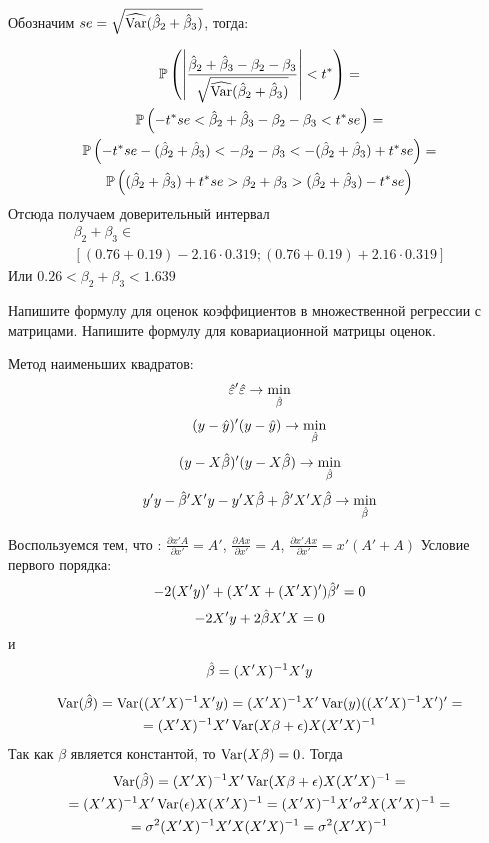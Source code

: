 \begin{solution}
\begin{enumerate}
Обозначим $se=\sqrt{\widehat{\operatorname{Var}}(\hat{\beta}_2 + \hat{\beta}_3)}$, тогда:

\begin{multline}
\mathbb{P} \left( \left| \frac{\hat{\beta}_2 + \hat{\beta}_3 - \beta_2 - \beta_3}{\sqrt{\widehat{\operatorname{Var}}(\hat{\beta}_2 + \hat{\beta}_3)}} \right| < t^* \right) = \\
\mathbb{P} \left( -t^* se < \hat{\beta}_2 + \hat{\beta}_3 - \beta_2 - \beta_3 < t^* se \right) = \\ 
\mathbb{P} \left( -t^*se  - (\hat{\beta}_2 + \hat{\beta}_3) < - \beta_2 - \beta_3  < -(\hat{\beta}_2 + \hat{\beta}_3) + t^* se \right) =\\ 
\mathbb{P} \left( (\hat{\beta}_2 + \hat{\beta}_3) + t^* se 
> \beta_2 + \beta_3 
> (\hat{\beta}_2 + \hat{\beta}_3) - t^* se \right) 
\end{multline}
Отсюда получаем доверительный интервал
\begin{multline}
\beta_2 + \beta_3 \in \\
[(0.76 + 0.19) - 2.16 \cdot 0.319;  (0.76 + 0.19) + 2.16 \cdot 0.319 ]
\end{multline}
Или $0.26< \beta_2 + \beta_3  < 1.639  $
\end{enumerate}
\end{solution}


\begin{problem}
Напишите формулу для оценок коэффициентов в множественной регрессии с матрицами. Напишите формулу для ковариационной матрицы оценок.
\end{problem}

\begin{solution}

Метод наименьших квадратов:
\[\hat{\varepsilon}'\hat{\varepsilon}\rightarrow \min_{\hat{\beta}}\]
\[(y-\hat{y})'(y-\hat{y})\rightarrow\min_{\hat{\beta}}\]
\[(y-X\hat{\beta})'(y-X\hat{\beta})\rightarrow\min_{\hat{\beta}}\]
\[y'y-\hat{\beta}' X'y-y'X\hat{\beta}+\hat{\beta}'X'X\hat{\beta}\rightarrow\min_{\hat{\beta}}\]

Воспользуемся тем, что : $\frac{\partial x'A}{\partial x'}=A'$, $\frac{\partial Ax}{\partial x'}=A$,
$\frac{\partial x'Ax}{\partial x'}=x'(A'+A)$
Условие первого порядка:
\[-2(X'y)'+(X'X+(X'X)')\hat{\beta}'=0\]
\[-2X'y+2\hat{\beta} X'X=0\]
и
\[\hat{\beta}=(X'X)^{-1}X'y\]

\begin{multline*}
\operatorname{Var}(\hat\beta)=\operatorname{Var}((X'X)^{-1}X'y)=(X'X)^{-1}X'\operatorname{Var}(y)((X'X)^{-1}X')'=\\
=(X'X)^{-1}X'\operatorname{Var}(X\beta+\epsilon)X(X'X)^{-1}
\end{multline*}
Так как $\beta$ является константой, то $\operatorname{Var}(X\beta)=0$. Тогда 
\begin{multline*}
\operatorname{Var}(\hat\beta)=(X'X)^{-1}X'\operatorname{Var}(X\beta+\epsilon)X(X'X)^{-1}=\\=(X'X)^{-1}X'\operatorname{Var}(\epsilon)X(X'X)^{-1}=
(X'X)^{-1}X'\sigma^2X(X'X)^{-1}=\\=\sigma^2(X'X)^{-1}X'X(X'X)^{-1}=\sigma^2(X'X)^{-1}
\end{multline*}
\end{solution}


